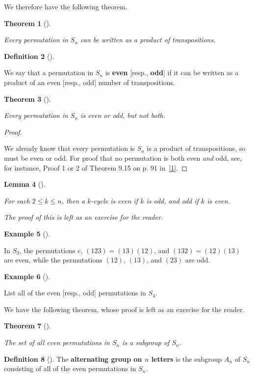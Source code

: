 \documentclass[10pt,]{book}
\newcommand{\terminology}[1]{\textbf{#1}}
\theoremstyle{plain}
\newtheorem{theorem}{Theorem}[section]
\newtheorem{lemma}[theorem]{Lemma}
\theoremstyle{definition}
\newtheorem{definition}[theorem]{Definition}
\theoremstyle{definition}
\theoremstyle{definition}
\newtheorem{example}[theorem]{Example}
\theoremstyle{definition}
\numberwithin{equation}{section}
\begin{document}
    We therefore have the following theorem.
\begin{theorem}[{}]\label{theorem-32}

        Every permutation in \(S_n\) can be written as a product of transpositions.
\end{theorem}
\begin{definition}[{}]\label{definition-48}

        We say that a permutation in \(S_n\) is \terminology{even} [resp., \terminology{odd}] if it can be written as a product of an even [resp., odd] number of transpositions.
\end{definition}
\begin{theorem}[{}]\label{theorem-33}

        Every permutation in \(S_n\) is even or odd, but not both.
\end{theorem}
\begin{proof}\hypertarget{proof-28}{}

      We already know that every permutation is \(S_n\) is a product of transpositions, so must be even or odd. For proof that no permutation is both even \emph{and} odd, see, for instance, Proof 1 or 2 of Theorem 9.15 on p. 91 in~\hyperlink{F}{[1]}.
\end{proof}
\begin{lemma}[{}]\label{evenodd}

        For each \(2\leq k\leq n\), then a \(k\)-cycle is even if \(k\) is odd, and odd if \(k\) is even.
\par
The proof of this is left as an exercise for the reader.%
\end{lemma}
\begin{example}[]\label{example-60}

        In \(S_3\), the permutations \(e\), \((123)=(13)(12)\), and \((132)=(12)(13)\) are even, while the permutations \((12)\), \((13)\), and \((23)\) are odd.
\end{example}
\begin{example}[]\label{example-61}

        List all of the even [resp., odd] permutations in \(S_4\).
\end{example}
\par
We have the following theorem, whose proof is left as an exercise for the reader.%
\begin{theorem}[{}]\label{theorem-34}

 The set of all even permutations in \(S_n\) is a subgroup of \(S_n\). 
\end{theorem}
\begin{definition}[{}]\label{definition-49}
The \terminology{alternating group on \(n\) letters} is the subgroup \(A_n\) of \(S_n\) consisting of all of the  even permutations in \(S_n\).      %
\label{notation-57}
\end{definition}
\par
\end{document}
